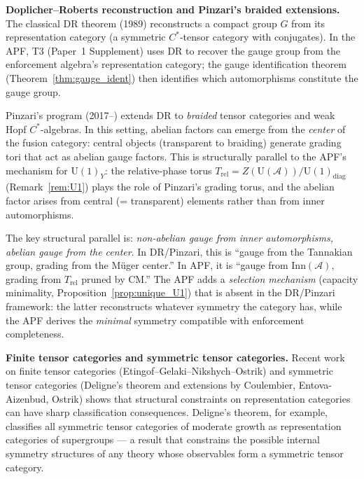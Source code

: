 \documentclass[11pt,a4paper]{article}
\theoremstyle{definition}
\newcommand{\U}{\mathrm{U}}
\begin{document}
\smallskip\noindent\textbf{Doplicher--Roberts reconstruction and
Pinzari's braided extensions.}\quad
The classical DR theorem (1989) reconstructs a compact group $G$ from
its representation category (a symmetric $C^*$-tensor category with
conjugates).  In the APF, T3 (Paper~1 Supplement) uses DR to recover
the gauge group from the enforcement algebra's representation
category; the gauge identification theorem
(Theorem~\ref{thm:gauge_ident}) then identifies which automorphisms
constitute the gauge group.

Pinzari's program (2017--) extends DR to \emph{braided} tensor
categories and weak Hopf $C^*$-algebras.  In this setting, abelian
factors can emerge from the \emph{center} of the fusion category:
central objects (transparent to braiding) generate grading tori that
act as abelian gauge factors.  This is structurally parallel to the
APF's mechanism for $\U(1)_Y$: the relative-phase torus
$T_{\mathrm{rel}} = Z(\mathrm{U}(\mathcal{A})) /
\mathrm{U}(1)_{\mathrm{diag}}$ (Remark~\ref{rem:U1}) plays the role
of Pinzari's grading torus, and the abelian factor arises from
central (= transparent) elements rather than from inner automorphisms.

The key structural parallel is: \emph{non-abelian gauge from inner
automorphisms, abelian gauge from the center}.  In DR/Pinzari, this
is ``gauge from the Tannakian group, grading from the M\"uger center.''
In APF, it is ``gauge from $\mathrm{Inn}(\mathcal{A})$, grading from
$T_{\mathrm{rel}}$ pruned by CM.''  The APF adds a \emph{selection
mechanism} (capacity minimality, Proposition~\ref{prop:unique_U1})
that is absent in the DR/Pinzari framework: the latter reconstructs
whatever symmetry the category has, while the APF derives the
\emph{minimal} symmetry compatible with enforcement completeness.

\smallskip\noindent\textbf{Finite tensor categories and symmetric
tensor categories.}\quad
Recent work on finite tensor categories (Etingof--Gelaki--Nikshych--Ostrik)
and symmetric tensor categories (Deligne's theorem and extensions by
Coulembier, Entova-Aizenbud, Ostrik) shows that structural constraints
on representation categories can have sharp classification
consequences.  Deligne's theorem, for example, classifies all
symmetric tensor categories of moderate growth as representation
categories of supergroups --- a result that constrains the possible
internal symmetry structures of any theory whose observables form a
symmetric tensor category.
\end{document}
